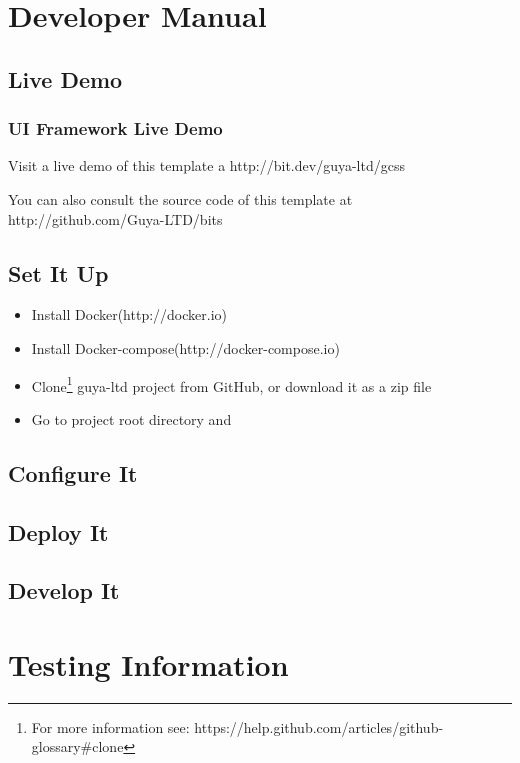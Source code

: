 \begin{appendices}
  
\chapter{Developer Manual}

\section{Live Demo}

\subsection{UI Framework Live Demo}
Visit a live demo of this template a http://bit.dev/guya-ltd/gcss

You can also consult the source code of this template at
http://github.com/Guya-LTD/bits
	
  
\section{Set It Up}

\begin{itemize}
	\item Install Docker(http://docker.io)
	\item Install Docker-compose(http://docker-compose.io)
	\item Clone\footnote{For more information see: https://help.github.com/articles/github-glossary\#clone} guya-ltd project from GitHub, or download it as a zip file
	\item Go to project root directory and
\end{itemize}


\section{Configure It}


  
\section{Deploy It}

\section{Develop It}

  
\chapter{Testing Information}
  

\end{appendices}
